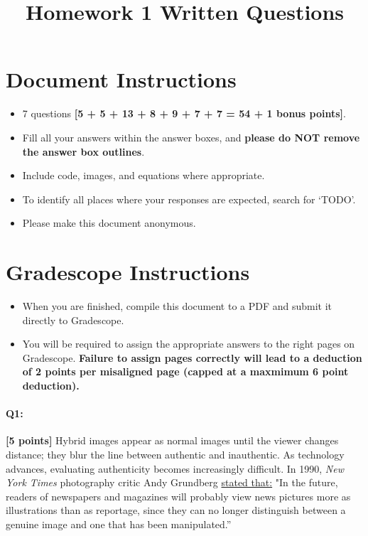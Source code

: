 \date{}

\title{\vspace{-1cm}Homework 1 Written Questions}



\maketitle
\vspace{-3cm}
\thispagestyle{fancy}

\section*{ Document Instructions}
\begin{itemize}
  \item 7 questions \textbf{[5 + 5 + 13 + 8 + 9 + 7 + 7 = 54 + 1 bonus points]}.
  \item Fill all your answers within the answer boxes, and \textbf{please do NOT remove the answer box outlines}.
  \item Include code, images, and equations where appropriate.
  \item To identify all places where your responses are expected, search for `TODO'.
  \item Please make this document anonymous.
\end{itemize}

\section*{ Gradescope Instructions}
\begin{itemize}
  \item When you are finished, compile this document to a PDF and submit it directly to Gradescope. 
  \item You will be required to assign the appropriate answers to the right pages on Gradescope. \textbf{Failure to assign pages correctly will lead to a deduction of 2 points per misaligned page (capped at a maxmimum 6 point deduction).}
\end{itemize}

\pagebreak

\paragraph{Q1:} \textbf{[5 points]} Hybrid images appear as normal images until the viewer changes distance; they blur the line between authentic and inauthentic. As technology advances, evaluating authenticity becomes increasingly difficult. In 1990, \emph{New York Times} photography critic Andy Grundberg \href{https://www.nytimes.com/1990/08/12/arts/photography-view-ask-it-no-questions-the-camera-can-lie.html}{stated that:} "In the future, readers of newspapers and magazines will probably view news pictures more as illustrations than as reportage, since they can no longer distinguish between a genuine image and one that has been manipulated.''

